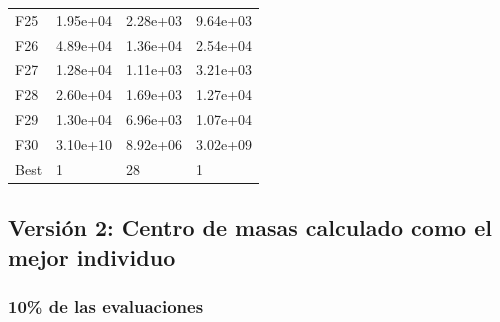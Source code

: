 \begin{table}[H]
\begin{minipage}{.5\linewidth}
\begin{tabular}{llll}
        F25  &   1.95e+04 &   2.28e+03 &  9.64e+03 \\
        F26  &   4.89e+04 &   1.36e+04 &  2.54e+04 \\
        F27  &   1.28e+04 &   1.11e+03 &  3.21e+03 \\
        F28  &   2.60e+04 &   1.69e+03 &  1.27e+04 \\
        F29  &   1.30e+04 &   6.96e+03 &  1.07e+04 \\
        F30  &   3.10e+10 &   8.92e+06 &  3.02e+09 \\
        Best &          1 &         28 &         1 \\
        \bottomrule
        \end{tabular}
        
    \end{minipage} 
\end{table}



\newpage
\subsection{Versión 2: Centro de masas calculado como el mejor individuo}

\subsubsection*{10\% de las evaluaciones}

